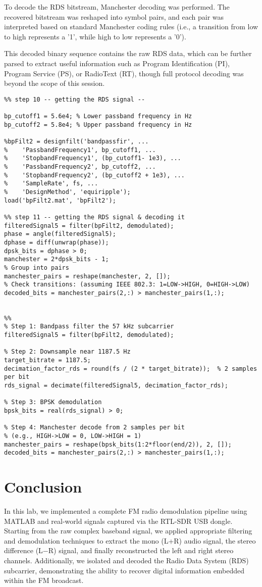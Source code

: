 \documentclass{article}
\begin{document}
To decode the RDS bitstream, Manchester decoding was performed. The recovered bitstream was reshaped into symbol pairs, and each pair was interpreted based on standard Manchester coding rules (i.e., a transition from low to high represents a '1', while high to low represents a '0').

This decoded binary sequence contains the raw RDS data, which can be further parsed to extract useful information such as Program Identification (PI), Program Service (PS), or RadioText (RT), though full protocol decoding was beyond the scope of this session.

\begin{lstlisting}
%% step 10 -- getting the RDS signal --

bp_cutoff1 = 5.6e4; % Lower passband frequency in Hz
bp_cutoff2 = 5.8e4; % Upper passband frequency in Hz

%bpFilt2 = designfilt('bandpassfir', ...
%    'PassbandFrequency1', bp_cutoff1, ...
%    'StopbandFrequency1', (bp_cutoff1- 1e3), ...
%    'PassbandFrequency2', bp_cutoff2, ...
%    'StopbandFrequency2', (bp_cutoff2 + 1e3), ...
%    'SampleRate', fs, ...
%    'DesignMethod', 'equiripple');
load('bpFilt2.mat', 'bpFilt2');

%% step 11 -- getting the RDS signal & decoding it
filteredSignal5 = filter(bpFilt2, demodulated);
phase = angle(filteredSignal5);                       
dphase = diff(unwrap(phase));           
dpsk_bits = dphase > 0;  
manchester = 2*dpsk_bits - 1;
% Group into pairs
manchester_pairs = reshape(manchester, 2, []);
% Check transitions: (assuming IEEE 802.3: 1=LOW->HIGH, 0=HIGH->LOW)
decoded_bits = manchester_pairs(2,:) > manchester_pairs(1,:);


%%
% Step 1: Bandpass filter the 57 kHz subcarrier
filteredSignal5 = filter(bpFilt2, demodulated);

% Step 2: Downsample near 1187.5 Hz
target_bitrate = 1187.5;
decimation_factor_rds = round(fs / (2 * target_bitrate));  % 2 samples per bit
rds_signal = decimate(filteredSignal5, decimation_factor_rds);

% Step 3: BPSK demodulation
bpsk_bits = real(rds_signal) > 0;

% Step 4: Manchester decode from 2 samples per bit
% (e.g., HIGH->LOW = 0, LOW->HIGH = 1)
manchester_pairs = reshape(bpsk_bits(1:2*floor(end/2)), 2, []);
decoded_bits = manchester_pairs(2,:) > manchester_pairs(1,:);

\end{lstlisting}

\section*{Conclusion}
In this lab, we implemented a complete FM radio demodulation pipeline using MATLAB and real-world signals captured via the RTL-SDR USB dongle. Starting from the raw complex baseband signal, we applied appropriate filtering and demodulation techniques to extract the mono (L+R) audio signal, the stereo difference (L−R) signal, and finally reconstructed the left and right stereo channels. Additionally, we isolated and decoded the Radio Data System (RDS) subcarrier, demonstrating the ability to recover digital information embedded within the FM broadcast.
\end{document}
